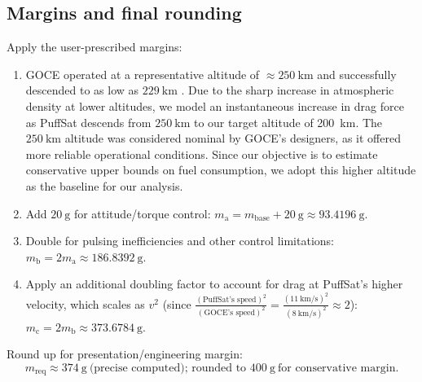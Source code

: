 \documentclass{article}
\begin{document}
\subsection*{Margins and final rounding}
Apply the user-prescribed margins:
\begin{enumerate}
  \item GOCE operated at a representative altitude of $\approx \SI{250}{\kilo\meter}$ and successfully descended to as low as $\SI{229}{\kilo\meter}$ \cite{goce_229km}. Due to the sharp increase in atmospheric density at lower altitudes, we model an instantaneous increase in drag force as PuffSat descends from $\SI{250}{\kilo\meter}$ to our target altitude of \SI{200}{\kilo\meter}. The $\SI{250}{\kilo\meter}$ altitude was considered nominal by GOCE’s designers, as it offered more reliable operational conditions. Since our objective is to estimate conservative upper bounds on fuel consumption, we adopt this higher altitude as the baseline for our analysis.
  \item Add \(\SI{20}{\g}\) for attitude/torque control: \(m_{\mathrm{a}} = m_{\mathrm{base}} + \SI{20}{\g} \approx \SI{93.4196}{\g}.\)
  \item Double for pulsing inefficiencies and other control limitations: \(m_{\mathrm{b}} = 2 m_{\mathrm{a}} \approx \SI{186.8392}{\g}.\)
  \item Apply an additional doubling factor to account for drag at PuffSat’s higher velocity, which scales as \(v^2\) (since $\frac{(\text{PuffSat's speed})^2}{(\text{GOCE's speed})^2} = \frac{\left(\SI{11}{\kilo\meter\per\second}\right)^2}{\left(\SI{8}{\kilo\meter\per\second}\right)^2}
 \approx 2$): \(m_{\mathrm{c}} = 2 m_{\mathrm{b}} \approx \SI{373.6784}{\g}.\)

\end{enumerate}

Round up for presentation/engineering margin:
\[
\boxed{m_{\mathrm{req}} \approx \SI{374}{\g}\ \text{(precise computed); rounded to }\SI{400}{\g}\ \text{for conservative margin}.}
\]
\end{document}
